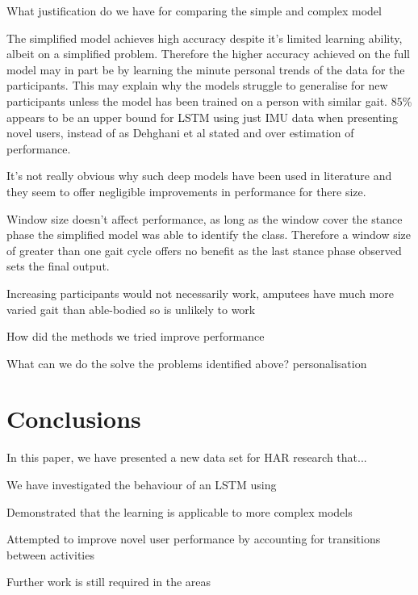 \documentclass[sensors,article,submit,moreauthors,pdftex]{Definitions/mdpi}
\begin{document}
What justification do we have for comparing the simple and complex model

The simplified model achieves high accuracy despite it's limited learning ability, albeit on a simplified problem. Therefore the higher accuracy achieved on the full model may in part be by learning the minute personal trends of the data for the participants. This may explain why the models struggle to generalise for new participants unless the model has been trained on a person with similar gait. 85\% appears to be an upper bound for LSTM using just IMU data when presenting novel users, instead of as Dehghani et al stated and over estimation of performance.

It's not really obvious why such deep models have been used in literature and they seem to offer negligible improvements in performance for there size.

Window size doesn't affect performance, as long as the window cover the stance phase the simplified model was able to identify the class. Therefore a window size of greater than one gait cycle offers no benefit as the last stance phase observed sets the final output.

Increasing participants would not necessarily work, amputees have much more varied gait than able-bodied so is unlikely to work

How did the methods we tried improve performance

What can we do the solve the problems identified above? personalisation


\section{Conclusions}%
In this paper, we have presented a new data set for HAR research that...

We have investigated the behaviour of an LSTM using 

Demonstrated that the learning is applicable to more complex models

Attempted to improve novel user performance by accounting for transitions between activities

Further work is still required in the areas

\vspace{6pt} 
\end{document}
